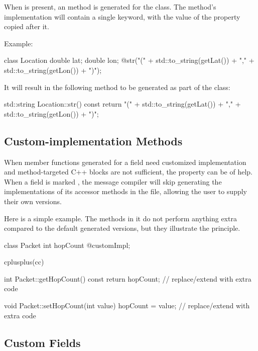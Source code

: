 When  is present, an  method is
generated for the class. The method's implementation will contain a single
 keyword, with the value of the  property copied
after it.

Example:

\begin{msg}
class Location {
    double lat;
    double lon;
    @str("(" + std::to_string(getLat()) + "," + std::to_string(getLon()) + ")");
}
\end{msg}

It will result in the following  method to be generated as part of
the  class:

\begin{cpp}
std::string Location::str() const
{
    return "(" + std::to_string(getLat()) + "," + std::to_string(getLon()) + ")";
}
\end{cpp}


\subsection{Custom-implementation Methods}
\label{sec:msg-defs:customimpl-fields}

When member functions generated for a field need customized implementation and
method-targeted C++ blocks are not sufficient, the  property
can be of help. When a field is marked , the message compiler
will skip generating the implementations of its accessor methods in the  file,
allowing the user to supply their own versions.

Here is a simple example. The methods in it do not perform anything extra
compared to the default generated versions, but they illustrate the principle.

\begin{msg}
class Packet
{
    int hopCount @customImpl;
}

cplusplus(cc) {{
int Packet::getHopCount() const
{
    return hopCount; // replace/extend with extra code
}

void Packet::setHopCount(int value)
{
    hopCount = value; // replace/extend with extra code
}
}}
\end{msg}


\subsection{Custom Fields}
\label{sec:msg-defs:custom-fields}


